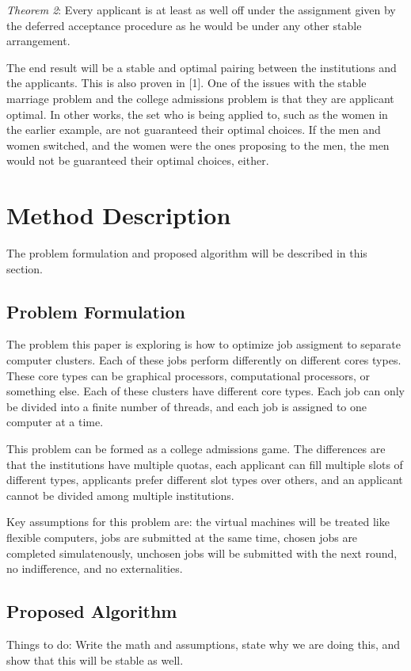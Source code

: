 \documentclass[conference]{IEEEtran}
\begin{document}
\emph{Theorem 2}:  Every applicant is at least as well off under the assignment
given by the deferred acceptance procedure as he would be under any other
stable arrangement.

The end result will be a stable and optimal pairing between
 the institutions and the applicants.  This is also proven in [1].  One 
of the issues with the stable marriage problem and the college admissions problem
is that they are applicant optimal.  In other works, the set who is being
applied to, such as the women in the earlier example, are not guaranteed
their optimal choices.  If the men and women switched, and the
women were the ones proposing to the men, the men would
not be guaranteed their optimal choices, either.

\section{Method Description}
The problem formulation and proposed algorithm will be
described in this section.

\subsection{Problem Formulation}
The problem this paper is exploring is how to optimize job 
assigment to separate computer clusters.  Each of these
jobs perform differently on different cores types.  These
core types can be graphical processors, computational
processors, or something else.  Each of these clusters
have different core types.  Each job can only be divided into
a finite number of threads, and each job is assigned to 
one computer at a time.

This problem can be formed as a college admissions
game.  The differences are that the institutions
have multiple quotas, each applicant can fill multiple
slots of different types, applicants prefer different
slot types over others, and an applicant cannot be
divided among multiple institutions.

Key assumptions for this problem are:  the virtual machines
will be treated like flexible computers, jobs are submitted at
the same time, chosen jobs are completed simulatenously,
unchosen jobs will be submitted with the next round, no
indifference, and no externalities.

\subsection{Proposed Algorithm}
Things to do:  Write the math and assumptions, state why
we are doing this, and show that this will be stable as well.
\end{document}
